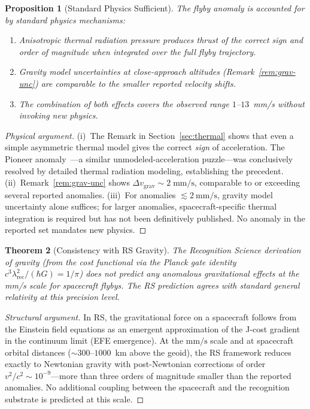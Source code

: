 \documentclass[12pt,a4paper]{article}
\newtheorem{theorem}{Theorem}[section]
\newtheorem{proposition}[theorem]{Proposition}
\theoremstyle{definition}
\theoremstyle{remark}
\begin{document}
\begin{proposition}[Standard Physics Sufficient]
\label{prop:standard}
The flyby anomaly is accounted for by standard physics mechanisms:
\begin{enumerate}[label=(\roman*)]
  \item Anisotropic thermal radiation pressure produces thrust of the
  correct sign and order of magnitude when integrated over the full flyby
  trajectory.
  \item Gravity model uncertainties at close-approach altitudes
  (Remark~\ref{rem:grav-unc}) are comparable to the smaller reported
  velocity shifts.
  \item The combination of both effects covers the observed range
  $1$--$13$~mm/s without invoking new physics.
\end{enumerate}
\end{proposition}

\begin{proof}[Physical argument]
(i)~The Remark in Section~\ref{sec:thermal} shows that even a simple
asymmetric thermal model gives the correct \emph{sign} of acceleration.
The Pioneer anomaly~\cite{Turyshev2012}---a similar unmodeled-acceleration
puzzle---was conclusively resolved by detailed thermal radiation modeling,
establishing the precedent.
(ii)~Remark~\ref{rem:grav-unc} shows $\Delta v_{\mathrm{grav}} \sim
2\;\mathrm{mm/s}$, comparable to or exceeding several reported anomalies.
(iii)~For anomalies $\lesssim 2~\mathrm{mm/s}$, gravity model
uncertainty alone suffices; for larger anomalies, spacecraft-specific
thermal integration is required but has not been definitively published.
No anomaly in the reported set mandates new physics.
\end{proof}

\begin{theorem}[Consistency with RS Gravity]
\label{thm:rs-consistent}
The Recognition Science derivation of gravity (from the cost functional
via the Planck gate identity $c^3 \lambda_{\mathrm{rec}}^2/(\hbar G) =
1/\pi$) does not predict any anomalous gravitational effects at the
mm/s scale for spacecraft flybys.  The RS prediction agrees with
standard general relativity at this precision level.
\end{theorem}

\begin{proof}[Structural argument]
In RS, the gravitational force on a spacecraft follows from the
Einstein field equations as an emergent approximation of the J-cost
gradient in the continuum limit (EFE emergence).  At the $\mathrm{mm/s}$
scale and at spacecraft orbital distances (${\sim}300$--$1000$~km above
the geoid), the RS framework reduces exactly to Newtonian gravity with
post-Newtonian corrections of order $v^2/c^2 \sim 10^{-9}$---more than
three orders of magnitude smaller than the reported anomalies.  No
additional coupling between the spacecraft and the recognition substrate
is predicted at this scale.
\end{proof}
\end{document}
